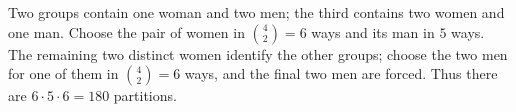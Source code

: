 Two groups contain one woman and two men; the third contains two women and one man. Choose the pair of women in $\binom42=6$ ways and its man in $5$ ways. The remaining two distinct women identify the other groups; choose the two men for one of them in $\binom42=6$ ways, and the final two men are forced. Thus there are $6\cdot5\cdot6=\boxed{180}$ partitions.
